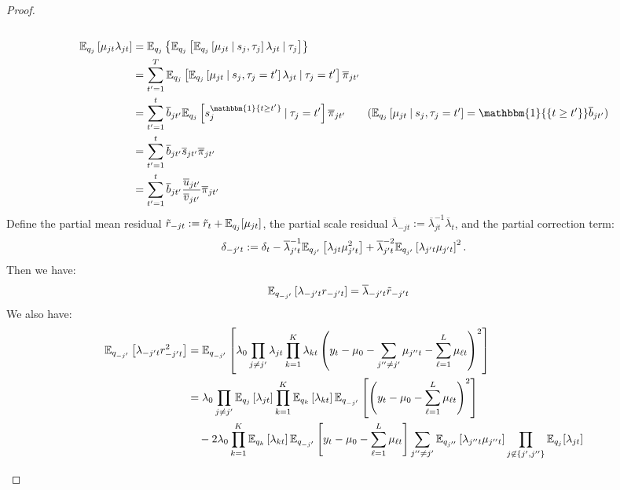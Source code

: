\begin{proof}
\begin{enumerate}[label=\roman*.]
\begin{align*}
\end{align*}
\begin{align*} 
    \E_{q_{j}}\left[ \mu_{jt}\lambda_{jt} \right] &= \E_{q_{j}}\left\{\E_{q_{j}}\left[\E_{q_{j}}\left[\mu_{j t}\:|\: s_j, \tau_j\right]\lambda_{j t}\:|\: \tau_j\right]\right\} \label{eq:lambda-beta} \\
    &= \sum_{t'=1}^T  \E_{q_{j}}\left[\E_{q_{j}}\left[\mu_{j t}\:|\: s_j, \tau_j = t'\right]\lambda_{j t}\:|\: \tau_j = t'\right]\overline{\pi}_{j t'} \\
    &= \sum_{t'=1}^t \overline{b}_{j t'}\E_{q_j}\left[s_j^{\mathbbm{1}\{t \geq t'\}}\:|\: \tau_j= t' \right] \overline{\pi}_{jt'} \tag{$\E_{q_j}\left[\mu_{j t}\:|\: s_j, \tau_j = t'\right] = \mathbbm{1}{\{t \geq t'\}} \overline{b}_{j t'}$} \\
    &= \sum_{t'=1}^t \overline{b}_{j t'}\overline{s}_{jt'} \overline{\pi}_{jt'} \\
    &=  \sum_{t'=1}^t \overline{b}_{j t'}\frac{\overline{u}_{jt'}}{\overline{v}_{jt'}} \overline{\pi}_{jt'} 
\end{align*}
\normalsize
Define the partial mean residual $\tilde{r}_{-j t} := \tilde{r}_{t} + \mathbb{E}_{q_{j}}[\mu_{j t}]$, the partial scale residual $\overline{\lambda}_{-j t} := \overline{\lambda}_{jt}^{-1}\overline{\lambda}_t$, and the partial correction term: 
\begin{align}
    \delta_{-j't} := \delta_t - \overline{\lambda}_{j't}^{-1}\mathbb{E}_{q_{j'}}\left[ \lambda_{jt}\mu_{j't}^2\right] +\overline{\lambda}_{j't}^{-2}\mathbb{E}_{q_{j'}}\left[ \lambda_{j't}\mu_{j't}\right]^2. \label{eq:delta-j}
\end{align}
Then we have:
\begin{align*}
     \mathbb{E}_{q_{-j'}}\left[\lambda_{-j't}r_{-j't}\right] &=\overline{\lambda}_{-j't}\tilde{r}_{-j' t} 
\end{align*}
We also have:
\footnotesize
\begin{align*}
    \E_{q_{-j'}}\left[\lambda_{-j't}r^2_{-j't}\right] &=  \E_{q_{-j'}}\left[\lambda_0\prod_{j \neq j'}\lambda_{jt} \prod_{k=1}^K \lambda_{kt}\left(y_t - \mu_0 - \sum_{j''\neq j'} \mu_{j''t} - \sum_{\ell=1}^L \mu_{\ell t}\right)^2\right] \\
    &= \lambda_0\prod_{j \neq j'}\E_{q_{j}}\left[\lambda_{jt}\right] \prod_{k=1}^K \E_{q_{k}}\left[\lambda_{kt}\right]\E_{q_{-j'}}\left[\left(y_t - \mu_0 - \sum_{\ell=1}^L \mu_{\ell t}\right)^2\right] \\
    &\quad -2 \lambda_0 \prod_{k=1}^K \E_{q_{k}}\left[\lambda_{kt}\right]\E_{q_{-j'}}\left[y_t - \mu_0  - \sum_{\ell=1}^L \mu_{\ell t}\right] \sum_{j''\neq j'} \E_{q_{j''}}\left[\lambda_{j''t} \mu_{j''t}\right]\prod_{j \not\in \{j',j''\}}\E_{q_{j}}[\lambda_{jt}]  \\

\end{align*}
\end{enumerate}
\end{proof}

